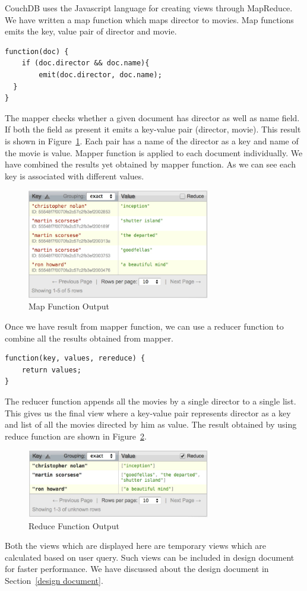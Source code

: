 \documentclass{sig-alternate}
\begin{document}
CouchDB uses the Javascript language for creating views through MapReduce. We have written a map function which maps director to movies. Map functions emits the key, value pair of director and movie.\\
\begin{verbatim}
function(doc) { 
    if (doc.director && doc.name){
        emit(doc.director, doc.name);
  }
}
\end{verbatim}
The mapper checks whether a given document has director as well as name field. If both the field as present it emits a key-value pair (director, movie). This result is shown in Figure~\ref{fig:map}. Each pair has a name of the director as a key and name of the movie is value. Mapper function is applied to each document individually. We have combined the results yet obtained by mapper function. As we can see each key is associated with different values.
\begin{figure}
  \centering
  \includegraphics[width=80mm]{map.jpg}
  \caption{Map Function Output
    \label{fig:map}}
\end{figure}

Once we have result from mapper function, we can use a reducer function to combine all the results obtained from mapper.
\begin{verbatim}
function(key, values, rereduce) {
    return values;
}
\end{verbatim}
The reducer function appends all the movies by a single director to a single list. This gives us the final view where a key-value pair represents director as a key and list of all the movies directed by him as value. The result obtained by using reduce function are shown in Figure~\ref{fig:reduce}.
\begin{figure}
  \centering
  \includegraphics[width = 80mm]{reduce.jpg}
  \caption{Reduce Function Output
    \label{fig:reduce}}
\end{figure}
Both the views which are displayed here are temporary views which are calculated based on user query. Such views can be included in design document for faster performance. We have discussed about the design document in Section~\ref{design document}.
\end{document}
